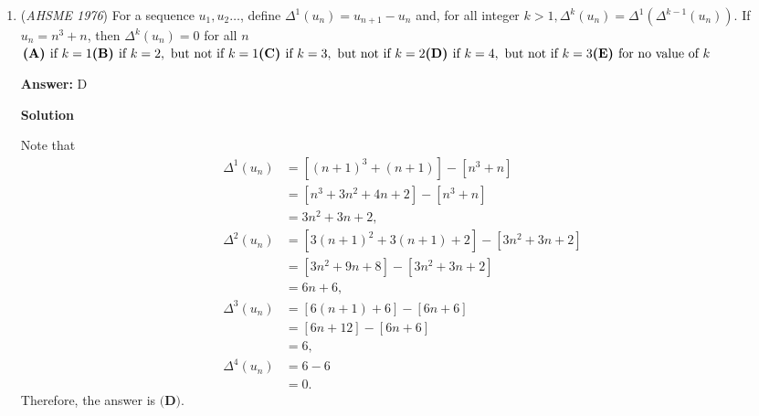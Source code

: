 \begin{enumerate}
 In right $\triangle LPM,$ we have $LP=\frac{R}{2}-r$ and $LM=\frac{R}{2}+r.$ By the Pythagorean Theorem, we get $PM^2=\left(\frac{R}{2}+r\right)^2-\left(\frac{R}{2}-r\right)^2.$

 We equate the expressions for $PM^2,$ then simplify:
 \begin{align*} (R-r)^2-r^2&=\left(\frac{R}{2}+r\right)^2-\left(\frac{R}{2}-r\right)^2 \\ \left(R^2-2Rr+r^2\right)-r^2&=\left(\frac{R^2}{4}+Rr+r^2\right)-\left(\frac{R^2}{4}-Rr+r^2\right) \\ R^2-2Rr&=2Rr \\ R^2&=4Rr \\ R&=4r. \end{align*}
Therefore, the ratio of the area of $\odot K$ to the area of $\odot M$ is $\frac{\pi R^2}{\pi r^2}=\left(\frac{R}{r}\right)^2=\boxed{\textbf{(C) }16}.$



	\item (\textit{AHSME 1976}) For a sequence $u_1,u_2\dots$, define $\Delta^1(u_n)=u_{n+1}-u_n$ and, for all integer 
$k>1, \Delta^k(u_n)=\Delta^1(\Delta^{k-1}(u_n))$. 
If $u_n=n^3+n$, then $\Delta^k(u_n)=0$ for all $n$
$\textbf{(A) }\text{if }k=1\qquad \\ \textbf{(B) }\text{if }k=2,\text{ but not if }k=1\qquad \\ \textbf{(C) }\text{if }k=3,\text{ but not if }k=2\qquad \\ \textbf{(D) }\text{if }k=4,\text{ but not if }k=3\qquad\\ \textbf{(E) }\text{for no value of }k$

 \textbf{Answer: }D



\textbf{Solution}

Note that
 \begin{align*} \Delta^1(u_n) &= \left[(n+1)^3+(n+1)\right]-\left[n^3+n\right] \\ &= \left[n^3+3n^2+4n+2\right]-\left[n^3+n\right] \\ &= 3n^2+3n+2, \\ \Delta^2(u_n) &= \left[3(n+1)^2+3(n+1)+2\right]-\left[3n^2+3n+2\right] \\ &= \left[3n^2+9n+8\right]-\left[3n^2+3n+2\right] \\ &= 6n+6, \\ \Delta^3(u_n) &= \left[6(n+1)+6\right]-\left[6n+6\right] \\ &= \left[6n+12\right]-\left[6n+6\right] \\ &= 6, \\ \Delta^4(u_n) &= 6-6 \\ &= 0. \end{align*}
Therefore, the answer is $\boxed{\textbf{(D)}}.$


\end{enumerate}
